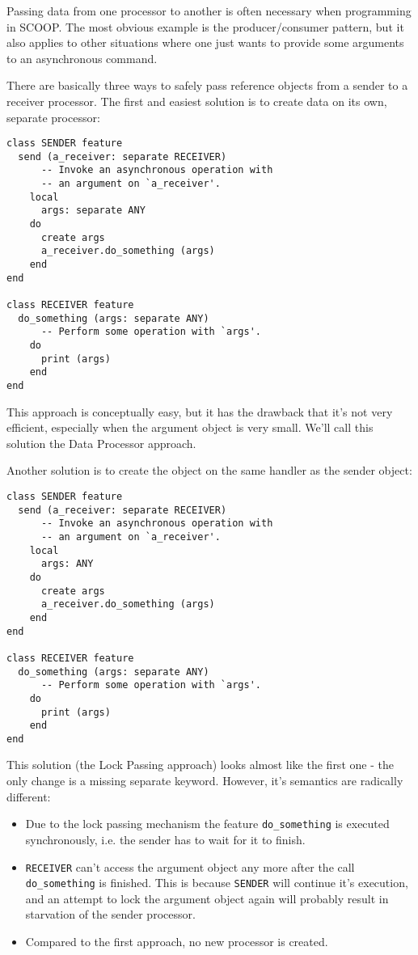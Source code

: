 \documentclass[a4paper,10pt]{article}
\begin{document}
Passing data from one processor to another is often necessary when programming in SCOOP.
The most obvious example is the producer/consumer pattern, but it also applies to other situations where one just wants to provide some arguments to an asynchronous command.


There are basically three ways to safely pass reference objects from a sender to a receiver processor.
The first and easiest solution is to create data on its own, separate processor: 
\begin{lstlisting}
class SENDER feature
  send (a_receiver: separate RECEIVER)
      -- Invoke an asynchronous operation with
      -- an argument on `a_receiver'.
    local
      args: separate ANY
    do
      create args
      a_receiver.do_something (args)
    end
end

class RECEIVER feature 
  do_something (args: separate ANY)
      -- Perform some operation with `args'.
    do
      print (args)
    end
end
\end{lstlisting}
This approach is conceptually easy, but it has the drawback that it's not very efficient, especially when the argument object is very small.
We'll call this solution the Data Processor approach.

Another solution is to create the object on the same handler as the sender object:
\begin{lstlisting}
class SENDER feature
  send (a_receiver: separate RECEIVER)
      -- Invoke an asynchronous operation with
      -- an argument on `a_receiver'.
    local
      args: ANY
    do
      create args
      a_receiver.do_something (args)
    end
end

class RECEIVER feature 
  do_something (args: separate ANY)
      -- Perform some operation with `args'.
    do
      print (args)
    end
end
\end{lstlisting}
This solution (the Lock Passing approach) looks almost like the first one - the only change is a missing separate keyword.
However, it's semantics are radically different:

\begin{itemize}
 \item Due to the lock passing mechanism  the feature \lstinline!do_something! is executed synchronously, i.e. the sender has to wait for it to finish.
 \item \lstinline!RECEIVER! can't access the argument object any more after the call \lstinline!do_something! is finished.
 This is because \lstinline!SENDER! will continue it's execution, and an attempt to lock the argument object again will probably result in starvation of the sender processor.
 \item Compared to the first approach, no new processor is created.
\end{itemize}
\end{document}

